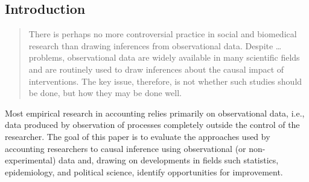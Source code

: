 \documentclass[11pt,reqno]{amsart}
\begin{document}
\clearpage

\begin{doublespace}
  
\section{Introduction}

\begin{quotation}
	There is perhaps no more controversial practice in social and biomedical research than drawing inferences from observational data.
	Despite \dots problems, observational data are widely available in many scientific fields and are routinely used to draw inferences about the causal impact of interventions.
	The key issue, therefore, is not whether such studies should be done, but how they may be done well.
\end{quotation}


Most empirical research in accounting relies primarily on observational data, i.e., data produced by observation of processes completely outside the control of the researcher. The goal of this paper is to evaluate the approaches used by accounting researchers to causal inference using observational (or non-experimental) data and, drawing on developments in fields such statistics, epidemiology, and political science, identify opportunities for improvement.


\end{doublespace}
\end{document}
